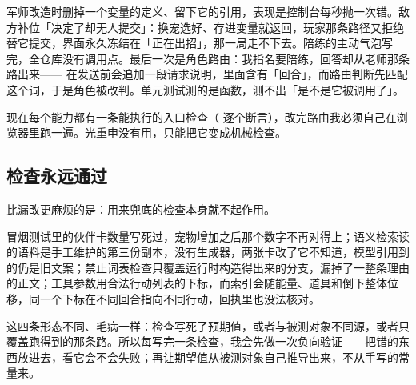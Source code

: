 军师改造时删掉一个变量的定义、留下它的引用，表现是控制台每秒抛一次错。敌方补位「决定了却无人提交」：换宠选好、存进变量就返回，玩家那条路径又拒绝替它提交，界面永久冻结在「正在出招」，那一局走不下去。陪练的主动气泡写完，全仓库没有调用点。最后一次是角色路由：我指名要陪练，回答却从老师那条路出来—— 在发送前会追加一段请求说明，里面含有「回合」，而路由判断先匹配这个词，于是角色被改判。单元测试测的是函数，测不出「是不是它被调用了」。

现在每个能力都有一条能执行的入口检查（ 逐个断言），改完路由我必须自己在浏览器里跑一遍。光重申没有用，只能把它变成机械检查。

\subsection{检查永远通过}

比漏改更麻烦的是：用来兜底的检查本身就不起作用。

冒烟测试里的伙伴卡数量写死过，宠物增加之后那个数字不再对得上；语义检索读的语料是手工维护的第三份副本，没有生成器，两张卡改了它不知道，模型引用到的仍是旧文案；禁止词表检查只覆盖运行时构造得出来的分支，漏掉了一整条理由的正文；工具参数用合法行动列表的下标，而索引会随能量、道具和倒下整体位移，同一个下标在不同回合指向不同行动，回执里也没法核对。

这四条形态不同、毛病一样：检查写死了预期值，或者与被测对象不同源，或者只覆盖跑得到的那条路。所以每写完一条检查，我会先做一次负向验证——把错的东西放进去，看它会不会失败；再让期望值从被测对象自己推导出来，不从手写的常量来。
